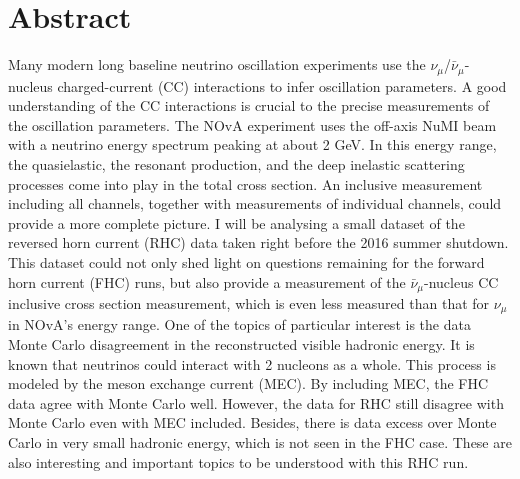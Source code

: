 \documentclass[12pt,letterpaper,oneside,openright]{book}
\begin{document}
\chapter*{\centering Abstract}
\begin{sloppypar}
Many modern long baseline neutrino oscillation experiments use the $\nu_\mu$/$\bar{\nu}_\mu$-nucleus charged-current (CC) interactions to infer oscillation parameters. A good understanding of the CC interactions is crucial to the precise measurements of the oscillation parameters. The NOvA experiment uses the off-axis NuMI beam with a neutrino energy spectrum peaking at about 2 GeV. In this energy range, the quasielastic, the resonant production, and the deep inelastic scattering processes come into play in the total cross section. An inclusive measurement including all channels, together with measurements of individual channels, could provide a more complete picture. I will be analysing a small dataset of the reversed horn current (RHC) data taken right before the 2016 summer shutdown. This dataset could not only shed light on questions remaining for the forward horn current (FHC) runs, but also provide a measurement of the $\bar{\nu}_\mu$-nucleus CC inclusive cross section measurement, which is even less measured than that for $\nu_\mu$ in NOvA's energy range. One of the topics of particular interest is the data Monte Carlo disagreement in the reconstructed visible hadronic energy. It is known that neutrinos  could interact with 2 nucleons as a whole. This process is modeled by the meson exchange current (MEC). By including MEC, the FHC data agree with Monte Carlo well. However, the data for RHC still disagree with Monte Carlo even with MEC included. Besides, there is data excess over Monte Carlo in very small hadronic energy, which is not seen in the FHC case. These are also interesting and important topics to be understood with this RHC run.
\end{sloppypar}
\end{document}
